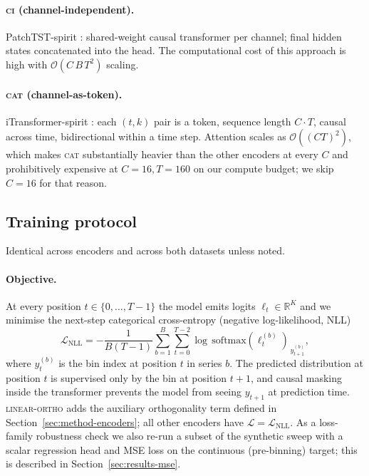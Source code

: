 \documentclass[11pt]{article}
\begin{document}
\paragraph{\textsc{ci} (channel-independent).} PatchTST-spirit
\citep{nie2023patchtst}: shared-weight causal transformer per channel;
final hidden states concatenated into the head. The computational cost
 of this approach is high with $\mathcal{O}(C\,B\,T^2)$ scaling.

\paragraph{\textsc{cat} (channel-as-token).} iTransformer-spirit
\citep{liu2024itransformer}: each $(t, k)$ pair is a token, sequence
length $C{\cdot}T$, causal across time, bidirectional within a time
step. Attention scales as $\mathcal{O}((CT)^2)$, which makes
\textsc{cat} substantially heavier than the other encoders at every
$C$ and prohibitively expensive at $C{=}16, T{=}160$ on our compute
budget; we skip $C{=}16$ for that reason.

\subsection{Training protocol}
\label{sec:method-training}

Identical across encoders and across both datasets unless noted.

\paragraph{Objective.} At every position $t \in \{0, \dots, T{-}1\}$
the model emits logits $\ell_t \in \mathbb{R}^{K}$ and we minimise the
next-step categorical cross-entropy (negative log-likelihood, NLL)
\[
\mathcal{L}_{\text{NLL}}
  = -\frac{1}{B(T{-}1)} \sum_{b=1}^{B} \sum_{t=0}^{T-2}
      \log\,\mathrm{softmax}(\ell_t^{(b)})_{\,y^{(b)}_{t+1}},
\]
where $y^{(b)}_t$ is the bin index at position $t$ in series $b$. The
predicted distribution at position $t$ is supervised only by the
bin at position $t+1$, and causal masking inside the transformer
prevents the model from seeing $y_{t+1}$ at prediction time.
\textsc{linear-ortho} adds the auxiliary orthogonality term
defined in Section~\ref{sec:method-encoders}; all other encoders
have $\mathcal{L} = \mathcal{L}_{\text{NLL}}$. As a
loss-family robustness check we also re-run a subset of the
synthetic sweep with a scalar regression head and MSE loss on the
continuous (pre-binning) target; this is described in
Section~\ref{sec:results-mse}.
\end{document}
